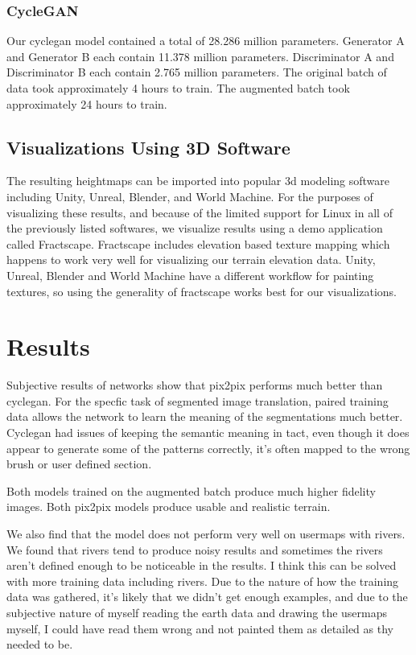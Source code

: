 \documentclass[twocolumn]{article}
\begin{document}
	\subsubsection{CycleGAN}
		Our cyclegan model contained a total of 28.286 million parameters. Generator A and Generator B each contain 11.378 million parameters. Discriminator A and Discriminator B each contain 2.765 million parameters. The original batch of data took approximately 4 hours to train. The augmented batch took approximately 24 hours to train.

	\subsection{Visualizations Using 3D Software}
	
	The resulting heightmaps can be imported into popular 3d modeling software including Unity, Unreal, Blender, and World Machine. For the purposes of visualizing these results, and because of the limited support for Linux in all of the previously listed softwares, we visualize results using a demo application called Fractscape. Fractscape includes elevation based texture mapping which happens to work very well for visualizing our terrain elevation data. Unity, Unreal, Blender and World Machine have a different workflow for painting textures, so using the generality of fractscape works best for our visualizations.

	\section{Results}
	
	Subjective results of networks show that pix2pix performs much better than cyclegan. For the specfic task of segmented image translation, paired training data allows the network to learn the meaning of the segmentations much better. Cyclegan had issues of keeping the semantic meaning in tact, even though it does appear to generate some of the patterns correctly, it's often mapped to the wrong brush or user defined section.
	
	Both models trained on the augmented batch produce much higher fidelity images. Both pix2pix models produce usable and realistic terrain.
	
	We also find that the model does not perform very well on usermaps with rivers. We found that rivers tend to produce noisy results and sometimes the rivers aren't defined enough to be noticeable in the results. I think this can be solved with more training data including rivers. Due to the nature of how the training data was gathered, it's likely that we didn't get enough examples, and due to the subjective nature of myself reading the earth data and drawing the usermaps myself, I could have read them wrong and not painted them as detailed as thy needed to be.
	
\end{document}
